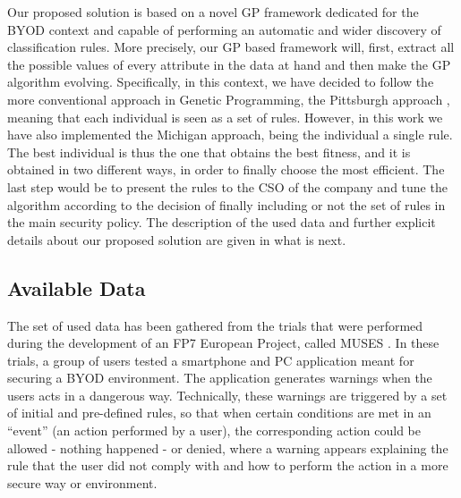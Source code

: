 \documentclass[a4paper,10pt,twocolumn,preprint,3p]{elsarticle}
\begin{document}
Our proposed solution is based on a novel GP framework dedicated for
the BYOD context and capable of performing an automatic and wider discovery of classification rules. More precisely, our GP based framework will, first, extract all the possible values of every attribute in the data at hand and then make the GP algorithm evolving. 
Specifically, in this context, we have decided to follow the more
conventional approach in Genetic Programming, the Pittsburgh approach
\cite{freitas2002data}, meaning that each individual is seen as a set
of rules. However, in this work we have also implemented the Michigan approach, being the individual a single rule. The best individual is thus the one that obtains the best fitness, and it is obtained in two different ways, in order to finally choose the most efficient. The last step would be to present the rules to the CSO of the company and tune the algorithm according to the decision of
finally including or not the set of rules in the main security
policy. The description of the used data and further explicit details
about our proposed solution are given in what is next.

\subsection{Available Data}
\label{subsec:data}

 The set of used data has been gathered from the trials that were performed
 during the development of an FP7 European Project, called MUSES
 \cite{DBLP:conf/sac/MoraCGZJEBAH14}. In these trials, a group of
 users tested a smartphone and PC application meant for securing a
 BYOD environment. The application generates warnings when the users
 acts in a dangerous way. Technically, these warnings are triggered by
 a set of initial and pre-defined rules, so that when certain
 conditions are met in an ``event'' (an action performed by a user),
 the corresponding action could be allowed - nothing happened - or
 denied, where a warning appears explaining the rule that the user did not comply with and how to perform the action in a more secure way or environment.
\end{document}
